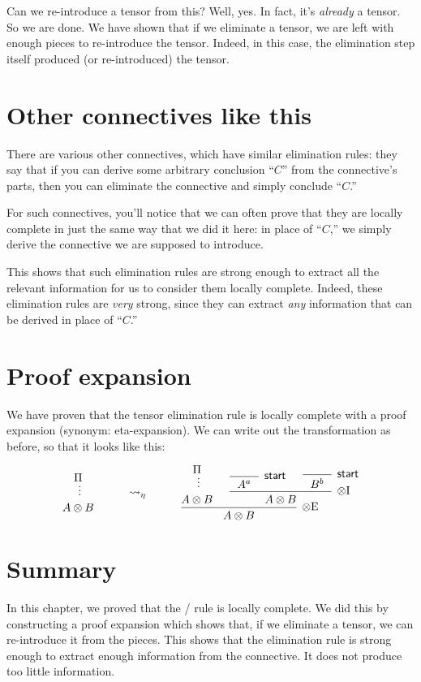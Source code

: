 \documentclass[../../../main.tex]{subfiles}
\begin{document}
\noindent
Can we re-introduce a tensor from this? Well, yes. In fact, it's \emph{already} a tensor. So we are done. We have shown that if we eliminate a tensor, we are left with enough pieces to re-introduce the tensor. Indeed, in this case, the elimination step itself produced (or re-introduced) the tensor.


\section{Other connectives like this}

There are various other connectives, which have similar elimination rules: they say that if you can derive some arbitrary conclusion ``$C$'' from the connective's parts, then you can eliminate the connective and simply conclude ``$C$.''

For such connectives, you'll notice that we can often prove that they are locally complete in just the same way that we did it here: in place of ``$C$,'' we simply derive the connective we are supposed to introduce.

This shows that such elimination rules are strong enough to extract all the relevant information for us to consider them locally complete. Indeed, these elimination rules are \emph{very} strong, since they can extract \emph{any} information that can be derived in place of ``$C$.''


\section{Proof expansion}

We have proven that the tensor elimination rule is locally complete with a proof expansion (synonym: eta-expansion). We can write out the transformation as before, so that it looks like this:

$$
\begin{prooftree}
  \hypo{\Proof/}
  \ellipsis{}{}
  \infer[no rule]1[]{A \tensor/ B}
\end{prooftree}
\hskip 1cm\rightsquigarrow_{\eta}\hskip 1cm
\begin{prooftree}
  \hypo{\Proof/}
  \ellipsis{}{}
  \infer[no rule]1[]{A \tensor/ B}
  \hypo{}
  \infer1[\startrule/]{~~A^{a}~~}
  \hypo{}
  \infer1[\startrule/]{~~B^{b}~~}
  \infer2[\tensorIntro/]{A \tensor/ B}
  \infer2[\tensorElim/]{A \tensor/ B}
\end{prooftree}
$$


\section{Summary}

In this chapter, we proved that the \tensorElim/ rule is locally complete. We did this by constructing a proof expansion which shows that, if we eliminate a tensor, we can re-introduce it from the pieces. This shows that the elimination rule is strong enough to extract enough information from the connective. It does not produce too little information.
\end{document}
